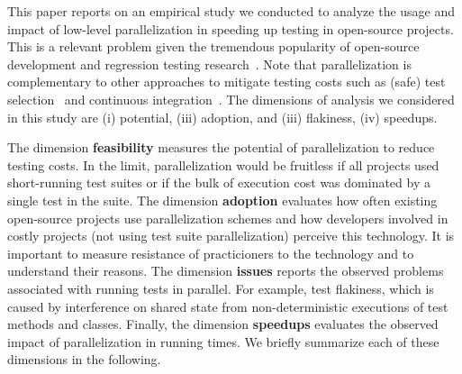 

This paper reports on an empirical study we conducted to analyze the
usage and impact of low-level parallelization in speeding up testing
in open-source projects.  This is a relevant problem given the
tremendous popularity of open-source development and regression
testing research~\cite{yoo-harman-stvr2012}.  Note that
parallelization is complementary to other approaches to mitigate
testing costs such as (safe) test
selection~\cite{Rothermel:1997:SER:248233.248262} and continuous
integration~\cite{Saff:2003:RWD:951952.952340}.  The dimensions of
analysis we considered in this study are (i) potential, (iii)
adoption, and (iii) flakiness, (iv) speedups.


The dimension \textbf{feasibility} measures the potential of
parallelization to reduce testing costs.  In the limit,
parallelization would be fruitless if all projects used short-running
test suites or if the bulk of execution cost was dominated by a single
test in the suite.  The dimension \textbf{adoption} evaluates how
often existing open-source projects use parallelization schemes and
how developers involved in costly projects (not using test suite
parallelization) perceive this technology.  It is important to measure
resistance of practicioners to the technology and to understand their
reasons.  The dimension \textbf{issues} reports the observed problems
associated with running tests in parallel.  For example, test
flakiness, which is caused by interference on shared state from
non-deterministic executions of test methods and classes.  Finally,
the dimension \textbf{speedups} evaluates the observed impact of
parallelization in running times.  We briefly summarize each of these
dimensions in the following.

